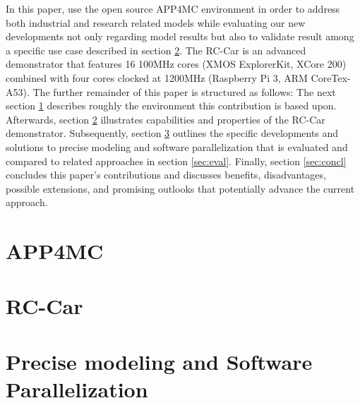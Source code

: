 \documentclass [a4paper,final,conference,10pt]{IDAACS}
\begin{document}
In this paper, use the open source APP4MC environment in order to address both industrial and research related models while evaluating our new developments not only regarding model results but also to validate result among a specific use case described in section \ref{sec:rccar}. The RC-Car is an advanced demonstrator that features 16 100MHz cores (XMOS ExplorerKit, XCore 200) combined with four cores clocked at 1200MHz (Raspberry Pi 3, ARM CoreTex-A53).
The further remainder of this paper is structured as follows: The next section \ref{sec:app4mc} describes roughly the environment this contribution is based upon. Afterwards, section \ref{sec:rccar} illustrates capabilities and properties of the RC-Car demonstrator. Subsequently, section \ref{sec:impl} outlines the specific developments and solutions to precise modeling and software parallelization that is evaluated and compared to related approaches in section \ref{sec:eval}. Finally, section \ref{sec:concl} concludes this paper's contributions and discusses benefits, disadvantages, possible extensions, and promising outlooks that potentially advance the current approach.


\section{APP4MC}
\label{sec:app4mc}

\section{RC-Car}
\label{sec:rccar}


\section{Precise modeling and Software Parallelization}
\label{sec:impl}

\end{document}
